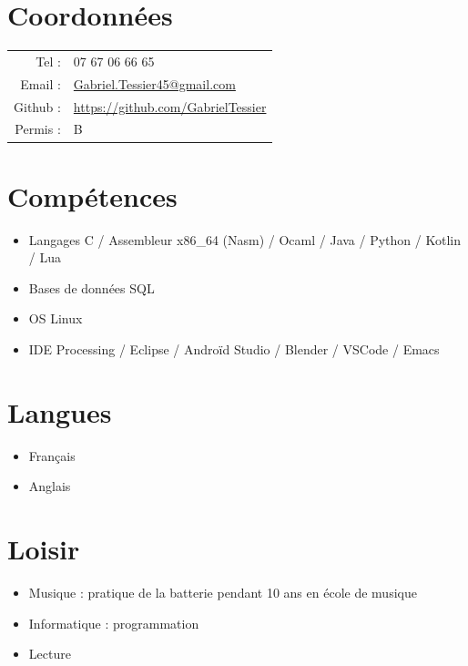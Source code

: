 \documentclass[11pt,oneside,a4paper,titlepage]{article}
\begin{document}
\begin{tcolorbox}
  \begin{minipage}[t]{8cm}
    \vspace*{-0.5cm}
    \begin{tcolorbox}[grow to left by=0.6cm,colback=gray!25,colframe=white]
      \section*{Coordonnées}
      \setlength{\tabcolsep}{2pt}
      \begin{tabular}{rl}
        Tel : & 07 67 06 66 65 \\
        Email : & \href{mailto:Gabriel.Tessier45@gmail.com}{Gabriel.Tessier45@gmail.com} \\
        Github : & \href{https://github.com/GabrielTessier}{https://github.com/GabrielTessier} \\
        Permis : & B
      \end{tabular}

      \section*{Compétences}
      \begin{itemize}
        \item{Langages C / Assembleur x86\_64 (Nasm) / Ocaml / Java / Python / Kotlin / Lua}
        \item{Bases de données SQL}
        \item{OS Linux}
        \item{IDE Processing / Eclipse / Androïd Studio / Blender / VSCode / Emacs}
      \end{itemize}

      \section*{Langues}
      \begin{itemize}
        \item{Français}
        \item{Anglais}
      \end{itemize}

      \section*{Loisir}
      \begin{itemize}
        \item{Musique : pratique de la batterie pendant 10 ans en école de musique}
        \item{Informatique : programmation}
        \item{Lecture}
      \end{itemize}
    \end{tcolorbox}
  \end{minipage}
  \begin{minipage}[t]{11cm}
    \vspace*{-0.5cm}
    \begin{tcolorbox}[grow to right by=0.75cm,colframe=white,colback=white]

\end{tcolorbox}
\end{minipage}
\end{tcolorbox}
\end{document}
